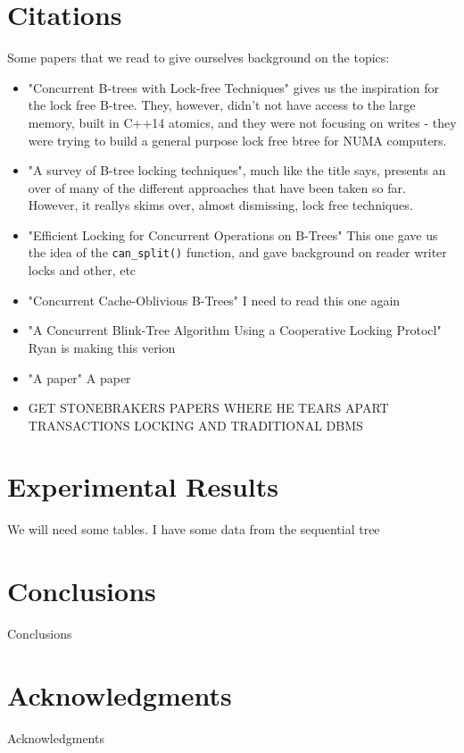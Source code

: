 \documentclass{sig-alternate}
\begin{document}
\section{Citations}
Some papers that we read to give ourselves background on the topics:
\begin{itemize}
  \item "Concurrent B-trees with Lock-free Techniques"\cite{sultana:lockfree} gives us the inspiration for the lock free B-tree.  They, however, didn't not have access to the large memory, built in C++14 atomics, and they were not focusing on writes - they were trying to build a general purpose lock free btree for NUMA computers.
  \item "A survey of B-tree locking techniques"\cite{graefe:survey}, much like the title says, presents an over of many of the different approaches that have been taken so far.  However, it reallys skims over, almost dismissing, lock free techniques.
  \item "Efficient Locking for Concurrent Operations on B-Trees" \cite{lehman:locking} This one gave us the idea of the \texttt{can\_split()} function, and gave background on reader writer locks and other, etc
  \item "Concurrent Cache-Oblivious B-Trees" \cite{bender:cache} I need to read this one again
  \item "A Concurrent Blink-Tree Algorithm Using a Cooperative Locking Protocl" \cite{lim:blink} Ryan is making this verion
  \item "A paper" A paper
  \item GET STONEBRAKERS PAPERS WHERE HE TEARS APART TRANSACTIONS LOCKING AND TRADITIONAL DBMS
\end{itemize}

\section{Experimental Results}
We will need some tables.  I have some data from the sequential tree

\section{Conclusions}
Conclusions

\section{Acknowledgments}
Acknowledgments



\end{document}

